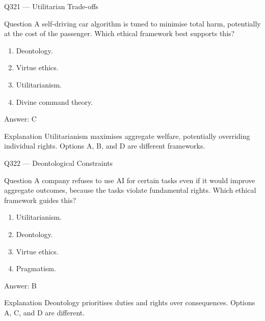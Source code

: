 \documentclass[aspectratio=169,8pt]{beamer}
\begin{document}
\begin{frame}{Q321 --- Utilitarian Trade-offs}
	\begin{block}{Question}
		A self-driving car algorithm is tuned to minimise total harm, potentially at the cost of the passenger. Which ethical framework best supports this?
		\begin{enumerate}
			\item Deontology.
			\item Virtue ethics.
			\item Utilitarianism.
			\item Divine command theory.
	\end{enumerate}  \end{block}
	\begin{exampleblock}{Answer: C}\end{exampleblock}
	\begin{block}{Explanation}
		Utilitarianism maximises aggregate welfare, potentially overriding individual rights. Options A, B, and D are different frameworks.
	\end{block}
\end{frame}

\begin{frame}{Q322 --- Deontological Constraints}
	\begin{block}{Question}
		A company refuses to use AI for certain tasks even if it would improve aggregate outcomes, because the tasks violate fundamental rights. Which ethical framework guides this?
		\begin{enumerate}
			\item Utilitarianism.
			\item Deontology.
			\item Virtue ethics.
			\item Pragmatism.
	\end{enumerate}  \end{block}
	\begin{exampleblock}{Answer: B}\end{exampleblock}
	\begin{block}{Explanation}
		Deontology prioritises duties and rights over consequences. Options A, C, and D are different.
	\end{block}
\end{frame}
\end{document}
